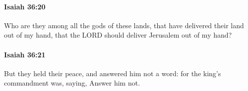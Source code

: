 		\paragraph{Isaiah 36:20} %
			\label{ISAIAH-36-20}

			Who are they among all the gods of these lands, that have delivered their land out of my hand, that the LORD should deliver Jerusalem out of my hand?


		\paragraph{Isaiah 36:21} %
			\label{ISAIAH-36-21}

			But they held their peace, and answered him not a word: for the king's commandment was, saying, Answer him not.


